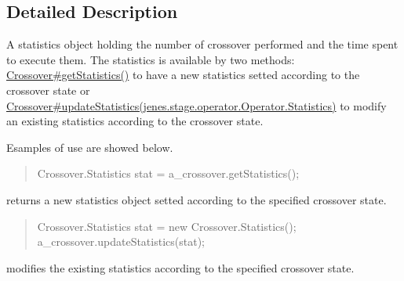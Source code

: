 \subsection{Detailed Description}
A statistics object holding the number of crossover performed and the time spent to execute them. The statistics is available by two methods\-: \hyperlink{}{Crossover\#get\-Statistics()} to have a new statistics setted according to the crossover state or \hyperlink{}{Crossover\#update\-Statistics(jenes.\-stage.\-operator.\-Operator.\-Statistics)} to modify an existing statistics according to the crossover state. 

Esamples of use are showed below. 

\begin{quotation}

\begin{DoxyPre}
Crossover.Statistics stat = a\_crossover.getStatistics();
\end{DoxyPre}
\end{quotation}


returns a new statistics object setted according to the specified crossover state. 

\begin{quotation}

\begin{DoxyPre}
Crossover.Statistics stat = new Crossover.Statistics();
a\_crossover.updateStatistics(stat);
\end{DoxyPre}
\end{quotation}


modifies the existing statistics according to the specified crossover state. 

